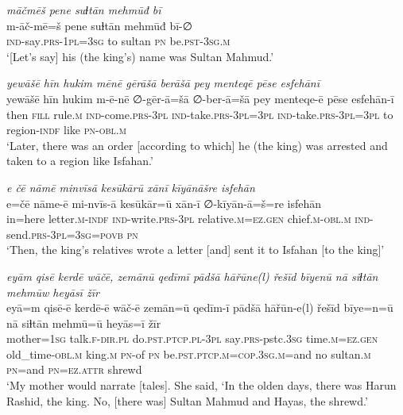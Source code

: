 \ea \label{KŠ.14}
\textit{māčmēš pene suɫtān mehmūđ bī} \\ 
\gll m-āč-mē=š pene suɫtān mehmūđ bī-∅ \\ 
 \textsc{ind-}say\textsc{.prs}\textsc{-\textsc{1pl}}\textsc{=3sg} to sultan \textsc{pn} be\textsc{.pst}\textsc{-3sg}\textsc{.m} \\ 
\glt `[Let’s say] his (the king's) name was Sultan Mahmud.'
\z 
 
\ea \label{KŠ.47}
\textit{yewāšē hīn hukim mēnē gērāšā berāšā pey menteqē pēse esfehānī} \\ 
\gll yewāšē hīn hukim m-ē-nē ∅-gēr-ā=šā ∅-ber-ā=šā pey menteqe-ē pēse esfehān-ī \\ 
 then \textsc{fill} rule\textsc{.m} \textsc{ind-}come\textsc{.prs}\textsc{-3pl} \textsc{ind-}take\textsc{.prs}\textsc{-3pl}\textsc{=3pl} \textsc{ind-}take\textsc{.prs}\textsc{-3pl}\textsc{=3pl} to region\textsc{-indf} like \textsc{pn}\textsc{-obl}\textsc{.m} \\ 
\glt `Later, there was an order [according to which] he (the king) was arrested and taken to a region like Isfahan.'
\z 
 
\ea \label{KŠ.50}
\textit{e čē nāmē minvīsā kesūkārū xānī kīyānāšre isfehān} \\ 
\gll e=čē nāme-ē mi-nvīs-ā kesūkār=ū xān-ī ∅-kīyān-ā=š=re isfehān \\ 
 in=here letter\textsc{.m}\textsc{-indf} \textsc{ind-}write\textsc{.prs}\textsc{-3pl} relative\textsc{.m}\textsc{=ez.gen} chief\textsc{.m}\textsc{-obl}\textsc{.m} \textsc{ind-}send\textsc{.prs}\textsc{-3pl}\textsc{=3sg}\textsc{=\textsc{povb}} \textsc{pn} \\ 
\glt `Then, the king’s relatives wrote a letter [and] sent it to Isfahan [to the king]'
\z 
 
\ea \label{ŽH.2}
\textit{eyām qisē kerdē wāčē, zemānū qedīmī pādšā hāřūne(l) řešīd bīyenū nā siɫtān mehmūw heyāsī žīr} \\ 
\gll eyā=m qisē-ē kerdē-ē wāč-ē zemān=ū qedīm-ī pādšā hāřūn-e(l) řešīd bīye=n=ū nā siɫtān mehmū=ū heyās=ī žīr \\ 
 mother\textsc{=1sg} talk\textsc{\textsc{.f}}\textsc{-dir}\textsc{.pl} do\textsc{.pst}\textsc{.ptcp}\textsc{.pl}\textsc{-3pl} say\textsc{.prs-}pstc\textsc{.3sg} time\textsc{.m}\textsc{=ez}\textsc{.gen} old\_time\textsc{-obl}\textsc{.m} king\textsc{.m} \textsc{pn}-of \textsc{pn} be\textsc{.pst}\textsc{.ptcp}\textsc{.m}\textsc{=cop}\textsc{.3sg}\textsc{.m}=and no sultan\textsc{.m} \textsc{pn}=and \textsc{pn}\textsc{=ez}.\textsc{attr} shrewd \\ 
\glt `My mother would narrate [tales]. She said, ‘In the olden days, there was Harun Rashid, the king. No, [there was] Sultan Mahmud and Hayas, the shrewd.'
\z 
 
